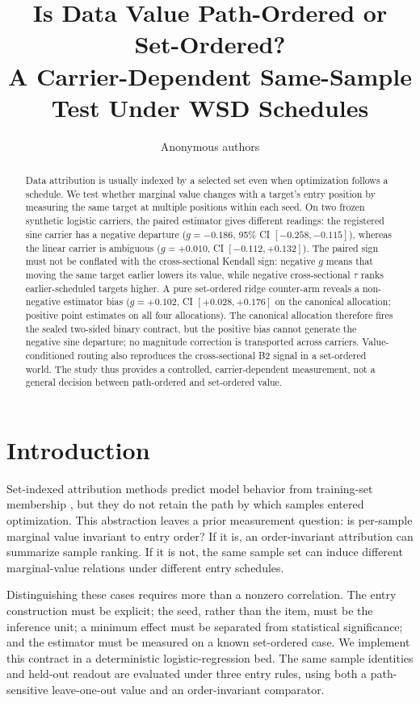 \documentclass{article}
\title{Is Data Value Path-Ordered or Set-Ordered?\\A Carrier-Dependent Same-Sample Test Under WSD Schedules}
\author{Anonymous authors}
\begin{document}
\maketitle

\begin{abstract}
Data attribution is usually indexed by a selected set even when optimization follows a schedule.
We test whether marginal value changes with a target's entry position by measuring the same target
at multiple positions within each seed. On two frozen synthetic logistic carriers, the paired
estimator gives different readings: the registered sine carrier has a negative departure
($g=-0.186$, 95\% CI $[-0.258,-0.115]$), whereas the linear carrier is ambiguous
($g=+0.010$, CI $[-0.112,+0.132]$). The paired sign must not be conflated with the
cross-sectional Kendall sign: negative $g$ means that moving the same target earlier lowers its
value, while negative cross-sectional $\tau$ ranks earlier-scheduled targets higher. A pure
set-ordered ridge counter-arm reveals a non-negative estimator bias ($g=+0.102$, CI
$[+0.028,+0.176]$ on the canonical allocation; positive point estimates on all four allocations).
The canonical allocation therefore fires the sealed two-sided binary contract, but the positive
bias cannot generate the negative sine departure; no magnitude correction is transported across
carriers. Value-conditioned routing also reproduces the cross-sectional B2 signal in a set-ordered
world. The study thus provides a controlled, carrier-dependent measurement, not a general decision
between path-ordered and set-ordered value.
\end{abstract}

\section{Introduction}
Set-indexed attribution methods predict model behavior from training-set membership
\citep{ilyas2022datamodels,park2023trak}, but they do not retain the path by which samples entered
optimization. This abstraction leaves a prior measurement question: is per-sample marginal value
invariant to entry order? If it is, an order-invariant attribution can summarize sample ranking. If
it is not, the same sample set can induce different marginal-value relations under different entry
schedules.

Distinguishing these cases requires more than a nonzero correlation. The entry construction must be
explicit; the seed, rather than the item, must be the inference unit; a minimum effect must be
separated from statistical significance; and the estimator must be measured on a known set-ordered
case. We implement this contract in a deterministic logistic-regression bed. The same sample
identities and held-out readout are evaluated under three entry rules, using both a path-sensitive
leave-one-out value and an order-invariant comparator.
\end{document}
